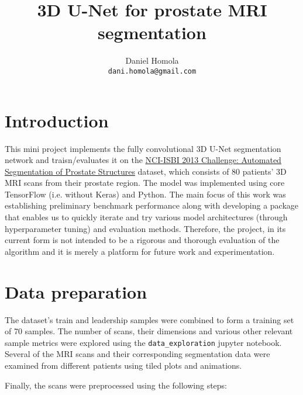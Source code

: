 \documentclass{article}
\title{3D U-Net for prostate MRI segmentation}
\author{
  Daniel Homola \\
  \texttt{dani.homola@gmail.com} \\
}
\begin{document}
\maketitle


\section{Introduction}
This mini project implements the fully convolutional 3D U-Net segmentation network \cite{_i_ek_2016} and traisn/evaluates it on the \href{https://goo.gl/fw8qku}{NCI-ISBI 2013 Challenge: Automated Segmentation of Prostate Structures} dataset, which consists of 80 patients' 3D MRI scans from their prostate region. The model was implemented using core TensorFlow (i.e. without Keras) and Python. The main focus of this work was establishing preliminary benchmark performance along with developing a package that enables us to quickly iterate and try various model architectures (through hyperparameter tuning) and evaluation methods. Therefore, the project, in its current form is not intended to be a rigorous and thorough evaluation of the algorithm and it is merely a platform for future work and experimentation.

\section{Data preparation}

The dataset's train and leadership samples were combined to form a training set of 70 samples. The number of scans, their dimensions and various other relevant sample metrics were explored using the \texttt{data\_exploration} jupyter notebook. Several of the MRI scans and their corresponding segmentation data were examined from different patients using tiled plots and animations. 

Finally, the scans were preprocessed using the following steps:
\end{document}
